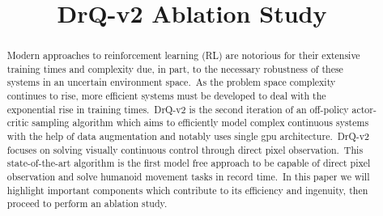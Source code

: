 \documentclass[conference]{./IEEEtran/IEEEtran} %
\begin{document}
    \title{DrQ-v2 Ablation Study}

    \author{
        \and
        \and
    }

    \maketitle

    \begin{abstract}
        
    Modern approaches to reinforcement learning (RL) are notorious for their extensive training times and complexity due, in part,
    to the necessary robustness of these systems in an uncertain environment space.\ As the problem space complexity continues to rise,
    more efficient systems must be developed to deal with the exponential rise in training times.\ DrQ-v2 is the second iteration of an
    off-policy actor-critic sampling algorithm which aims to efficiently model complex continuous systems with the help of data
    augmentation and notably uses single gpu architecture.\ DrQ-v2 focuses on solving visually continuous control through direct
    pixel observation.\ This state-of-the-art algorithm is the first model free approach to be capable of direct pixel observation
    and solve humanoid movement tasks in record time.\ In this paper we will highlight important components which contribute to its
    efficiency and ingenuity, then proceed to perform an ablation study.


    \end{abstract}
\end{document}

